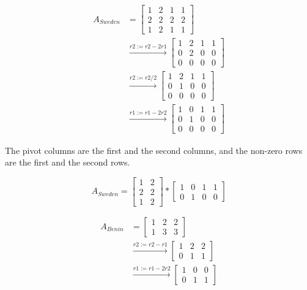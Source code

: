 \documentclass{article}
\begin{document}
\begin{align*}
    A_{Sweden} &=
        \begin{bmatrix}
            1 & 2 & 1 & 1 \\
            2 & 2 & 2 & 2 \\
            1 & 2 & 1 & 1
        \end{bmatrix} \\
    &\xrightarrow{r2 := r2 - 2r1}
        \begin{bmatrix}
            1 & 2 & 1 & 1 \\
            0 & 2 & 0 & 0 \\
            0 & 0 & 0 & 0
        \end{bmatrix} \\
    &\xrightarrow{r2 := r2/2}
        \begin{bmatrix}
            1 & 2 & 1 & 1 \\
            0 & 1 & 0 & 0 \\
            0 & 0 & 0 & 0
        \end{bmatrix} \\
    &\xrightarrow{r1 := r1 - 2r2}
        \begin{bmatrix}
            1 & 0 & 1 & 1 \\
            0 & 1 & 0 & 0 \\
            0 & 0 & 0 & 0
        \end{bmatrix}
\end{align*}

The pivot columns are the first and the second columns, and the non-zero rows are the first and the second rows.

\[A_{Sweden} =
    \begin{bmatrix}
        1 & 2 \\
        2 & 2 \\
        1 & 2
    \end{bmatrix}
    *
    \begin{bmatrix}
        1 & 0 & 1 & 1 \\
        0 & 1 & 0 & 0
    \end{bmatrix}
\]

\begin{align*}
    A_{Benin} &=
        \begin{bmatrix}
            1 & 2 & 2 \\
            1 & 3 & 3
        \end{bmatrix} \\
    &\xrightarrow{r2 := r2 - r1}
        \begin{bmatrix}
            1 & 2 & 2 \\
            0 & 1 & 1
        \end{bmatrix} \\
    &\xrightarrow{r1 := r1 - 2r2}
        \begin{bmatrix}
            1 & 0 & 0 \\
            0 & 1 & 1
        \end{bmatrix} \\
\end{align*}
\end{document}
